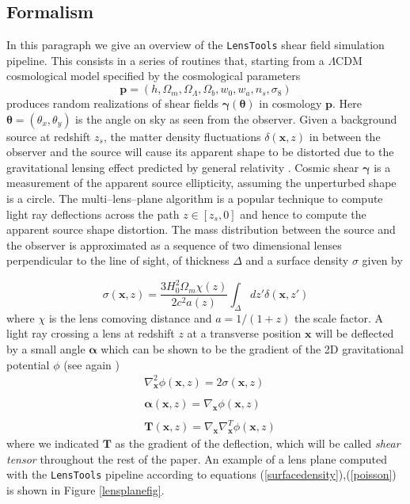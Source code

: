 \documentclass[5p]{elsarticle}
\newcommand{\bb}[1]{\mathbf{#1}}
\newcommand{\LT}{\texttt{LensTools} }
\begin{document}
\subsection{Formalism}
%
In this paragraph we give an overview of the \LT shear field simulation pipeline. This consists in a series of routines that, starting from a $\Lambda$CDM cosmological model specified by the cosmological parameters 
\begin{equation}
\bb{p}=(h,\Omega_m,\Omega_\Lambda,\Omega_b,w_0,w_a,n_s,\sigma_8)
\end{equation} 
%
produces random realizations of shear fields $\pmb{\gamma}(\pmb{\theta})$ in cosmology $\bb{p}$. Here $\pmb{\theta}=(\theta_x,\theta_y)$ is the angle on sky as seen from the observer. Given a background source at redshift $z_s$, the matter density fluctuations $\delta(\bb{x},z)$ in between the observer and the source will cause its apparent shape to be distorted due to the gravitational lensing effect predicted by general relativity \citep{wlreview}. Cosmic shear $\pmb{\gamma}$ is a measurement of the apparent source ellipticity, assuming the unperturbed shape is a circle. The multi--lens--plane algorithm \citep{RayTracingHartlap,Ray1,Ray2,Ray3} is a popular technique to compute light ray deflections across the path $z\in[z_s,0]$ and hence to compute the apparent source shape distortion. The mass distribution between the source and the observer is approximated as a sequence of two dimensional lenses perpendicular to the line of sight, of thickness $\Delta$ and a surface density $\sigma$ given by 

\begin{equation}
\label{surfacedensity}
\sigma(\bb{x},z) = \frac{3H_0^2\Omega_m\chi(z)}{2c^2a(z)}\int_\Delta dz'\delta(\bb{x},z')
\end{equation}
%
where $\chi$ is the lens comoving distance and $a=1/(1+z)$ the scale factor. A light ray crossing a lens at redshift $z$ at a transverse position $\bb{x}$ will be deflected by a small angle $\pmb{\alpha}$ which can be shown to be the gradient of the 2D gravitational potential $\phi$ (see again \citep{RayTracingHartlap}) 
%
\begin{equation}
\label{poisson}
\begin{matrix}
& \nabla^2_\bb{x} \phi(\bb{x},z) = 2\sigma(\bb{x},z) \\ \\
& \pmb{\alpha}(\bb{x},z) = \nabla_\bb{x} \phi(\bb{x},z) \\ \\
& \bb{T}(\bb{x},z) = \nabla_\bb{x}\nabla_\bb{x}^T \phi(\bb{x},z)
\end{matrix}
\end{equation}
%
where we indicated $\bb{T}$ as the gradient of the deflection, which will be called \textit{shear tensor} throughout the rest of the paper. An example of a lens plane computed with the \LT pipeline according to equations (\ref{surfacedensity}),(\ref{poisson}) is shown in Figure \ref{lensplanefig}. 
\end{document}
